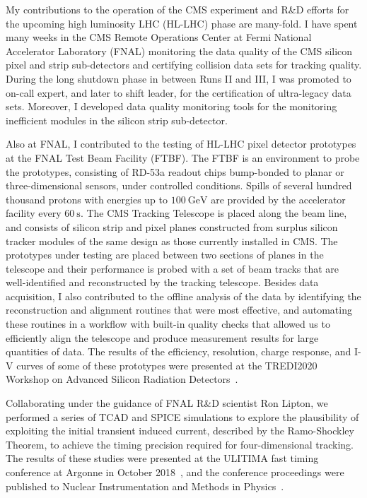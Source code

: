 My contributions to the operation of the CMS experiment and R\&D efforts for the upcoming high luminosity LHC (HL-LHC) phase are many-fold.
I have spent many weeks in the CMS Remote Operations Center at Fermi National Accelerator Laboratory (FNAL) monitoring the data quality of the CMS silicon pixel and strip sub-detectors and certifying collision data sets for tracking quality.
During the long shutdown phase in between Runs II and III, I was promoted to on-call expert, and later to shift leader, for the certification of ultra-legacy data sets.
Moreover, I developed data quality monitoring tools for the monitoring inefficient modules in the silicon strip sub-detector.

Also at FNAL, I contributed to the testing of HL-LHC pixel detector prototypes at the FNAL Test Beam Facility (FTBF).
The FTBF is an environment to probe the prototypes, consisting of RD-53a readout chips bump-bonded to planar or three-dimensional sensors, under controlled conditions.
Spills of several hundred thousand protons with energies up to $\SI{100}{\GeV}$ are provided by the accelerator facility every $\SI{60}{\s}$.
The CMS Tracking Telescope is placed along the beam line, and consists of silicon strip and pixel planes constructed from surplus silicon tracker modules of the same design as those currently installed in CMS.
The prototypes under testing are placed between two sections of planes in the telescope and their performance is probed with a set of beam tracks that are well-identified and reconstructed by the tracking telescope.
Besides data acquisition, I also contributed to the offline analysis of the data by identifying the reconstruction and alignment routines that were most effective, and automating these routines in a workflow with built-in quality checks that allowed us to efficiently align the telescope and produce measurement results for large quantities of data.
The results of the efficiency, resolution, charge response, and I-V curves of some of these prototypes were presented at the TREDI2020 Workshop on Advanced Silicon Radiation Detectors~\cite{TREDI2020}.

Collaborating under the guidance of FNAL R\&D scientist Ron Lipton, we performed a series of TCAD and SPICE simulations to explore the plausibility of exploiting the initial transient induced current, described by the Ramo-Shockley Theorem, to achieve the timing precision required for four-dimensional tracking.
The results of these studies were presented at the ULITIMA fast timing conference at Argonne in October 2018~\cite{ULITIMA2018}, and the conference proceedings were published to Nuclear Instrumentation and Methods in Physics~\cite{LIPTON2019162423}.


